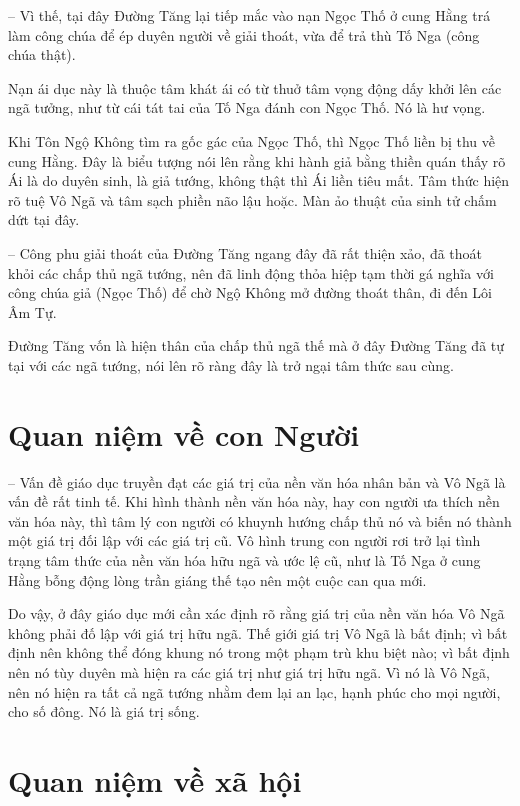 -- Vì thế, tại đây Đường Tăng lại tiếp mắc vào nạn Ngọc Thố ở cung Hằng trá làm công chúa để ép duyên người về giải thoát, vừa để trả thù Tố Nga (công chúa thật).

Nạn ái dục này là thuộc tâm khát ái có từ thuở tâm vọng động dấy khởi lên các ngã tưởng, như từ cái tát tai của Tố Nga đánh con Ngọc Thố. Nó là hư vọng.

Khi Tôn Ngộ Không tìm ra gốc gác của Ngọc Thố, thì Ngọc Thố liền bị thu về cung Hằng. Đây là biểu tượng nói lên rằng khi hành giả bằng thiền quán thấy rõ Ái là do duyên sinh, là giả tướng, không thật thì Ái liền tiêu mất. Tâm thức hiện rõ tuệ Vô Ngã và tâm sạch phiền não lậu hoặc. Màn ảo thuật của sinh tử chấm dứt tại đây.

-- Công phu giải thoát của Đường Tăng ngang đây đã rất thiện xảo, đã thoát khỏi các chấp thủ ngã tướng, nên đã linh động thỏa hiệp tạm thời gá nghĩa với công chúa giả (Ngọc Thố) để chờ Ngộ Không mở đường thoát thân, đi đến Lôi Âm Tự.

Đường Tăng vốn là hiện thân của chấp thủ ngã thế mà ở đây Đường Tăng đã tự tại với các ngã tướng, nói lên rõ ràng đây là trở ngại tâm thức sau cùng.

\section{Quan niệm về con Người} %
\label{sec:91_92_95_con_nguoi}

-- Vấn đề giáo dục truyền đạt các giá trị của nền văn hóa nhân bản và Vô Ngã là vấn đề rất tinh tế. Khi hình thành nền văn hóa này, hay con người ưa thích nền văn hóa này, thì tâm lý con người có khuynh hướng chấp thủ nó và biến nó thành một giá trị đối lập với các giá trị cũ. Vô hình trung con người rơi trở lại tình trạng tâm thức của nền văn hóa hữu ngã và ước lệ cũ, như là Tố Nga ở cung Hằng bỗng động lòng trần giáng thế tạo nên một cuộc can qua mới.

Do vậy, ở đây giáo dục mới cần xác định rõ rằng giá trị của nền văn hóa Vô Ngã không phải đố lập với giá trị hữu ngã. Thế giới giá trị Vô Ngã là bất định; vì bất định nên không thể đóng khung nó trong một phạm trù khu biệt nào; vì bất định nên nó tùy duyên mà hiện ra các giá trị như giá trị hữu ngã. Vì nó là Vô Ngã, nên nó hiện ra tất cả ngã tướng nhằm đem lại an lạc, hạnh phúc cho mọi người, cho số đông. Nó là giá trị sống.

\section{Quan niệm về xã hội} %
\label{sec:91_92_95_xa_hoi}

